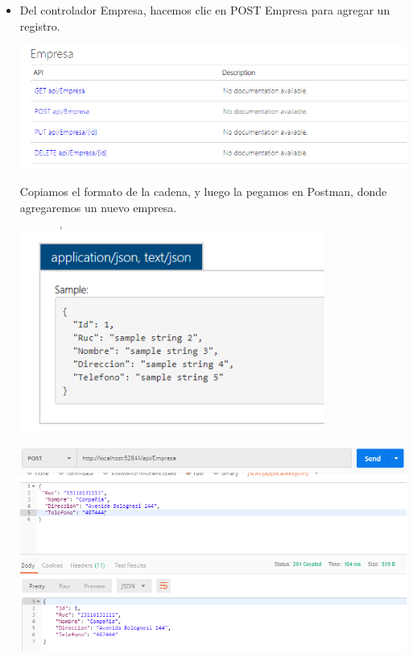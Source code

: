 \begin{itemize}
\begin{center}
             \end{center}
\item Del controlador Empresa, hacemos clic en POST Empresa para agregar un registro.
 \begin{center}
			\includegraphics[width=15cm]{./Imagenes/emp}
             \end{center}
Copiamos el formato de la cadena, y luego la pegamos en Postman, donde agregaremos un nuevo empresa.
 \begin{center}
			\includegraphics[width=10cm]{./Imagenes/em}
             \end{center}
 \begin{center}
			\includegraphics[width=15cm]{./Imagenes/pem}
             \end{center}

\end{itemize}



        
        
        

